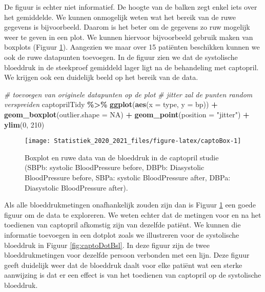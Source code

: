 \documentclass[
  12pt,dutch,coursenotes]{book}
\newenvironment{Shaded}{\begin{snugshade}}{\end{snugshade}}
\newcommand{\CommentTok}[1]{\textcolor[rgb]{0.56,0.35,0.01}{\textit{#1}}}
\newcommand{\DataTypeTok}[1]{\textcolor[rgb]{0.13,0.29,0.53}{#1}}
\newcommand{\DecValTok}[1]{\textcolor[rgb]{0.00,0.00,0.81}{#1}}
\newcommand{\KeywordTok}[1]{\textcolor[rgb]{0.13,0.29,0.53}{\textbf{#1}}}
\newcommand{\NormalTok}[1]{#1}
\newcommand{\OperatorTok}[1]{\textcolor[rgb]{0.81,0.36,0.00}{\textbf{#1}}}
\newcommand{\OtherTok}[1]{\textcolor[rgb]{0.56,0.35,0.01}{#1}}
\newcommand{\StringTok}[1]{\textcolor[rgb]{0.31,0.60,0.02}{#1}}
\theoremstyle{definition}
\theoremstyle{definition}
\theoremstyle{definition}
\theoremstyle{remark}
\begin{document}
De figuur is echter niet informatief.
De hoogte van de balken zegt enkel iets over het gemiddelde.
We kunnen onmogelijk weten wat het bereik van de ruwe gegevens is bijvoorbeeld.
Daarom is het beter om de gegevens zo ruw mogelijk weer te geven in een plot.
We kunnen hiervoor bijvoorbeeld gebruik maken van boxplots (Figuur \ref{fig:captoBox}).
Aangezien we maar over 15 patiënten beschikken kunnen we ook de ruwe datapunten toevoegen.
In de figuur zien we dat de systolische bloeddruk in de steekproef gemiddeld lager ligt na de behandeling met captopril.
We krijgen ook een duidelijk beeld op het bereik van de data.

\begin{Shaded}
\begin{Highlighting}[]
\CommentTok{\# toevoegen van originele datapunten op de plot}
\CommentTok{\# jitter zal de punten random verspreiden}
\NormalTok{captoprilTidy }\OperatorTok{\%\textgreater{}\%}\StringTok{ }\KeywordTok{ggplot}\NormalTok{(}\KeywordTok{aes}\NormalTok{(}\DataTypeTok{x =}\NormalTok{ type, }\DataTypeTok{y =}\NormalTok{ bp)) }\OperatorTok{+}\StringTok{ }\KeywordTok{geom\_boxplot}\NormalTok{(}\DataTypeTok{outlier.shape =} \OtherTok{NA}\NormalTok{) }\OperatorTok{+}\StringTok{ }
\StringTok{    }\KeywordTok{geom\_point}\NormalTok{(}\DataTypeTok{position =} \StringTok{"jitter"}\NormalTok{) }\OperatorTok{+}\StringTok{ }\KeywordTok{ylim}\NormalTok{(}\DecValTok{0}\NormalTok{, }\DecValTok{210}\NormalTok{)}
\end{Highlighting}
\end{Shaded}

\begin{figure}

{\centering \texttt{[image: Statistiek\_2020\_2021\_files/figure-latex/captoBox-1]} 

}

\caption{Boxplot en ruwe data van de bloeddruk in de captopril studie (SBPb: systolic BloodPressure before, DBPb: Diasystolic BloodPressure before, SBPa: systolic BloodPressure after, DBPa: Diasystolic BloodPressure after).}\label{fig:captoBox}
\end{figure}

Als alle bloeddrukmetingen onafhankelijk zouden zijn dan is Figuur \ref{fig:captoBox} een goede figuur om de data te exploreren.
We weten echter dat de metingen voor en na het toedienen van captopril afkomstig zijn van dezelfde patiënt.
We kunnen die informatie toevoegen in een dotplot zoals we illustreren voor de systolische bloeddruk in Figuur \ref{fig:captoDotBsl}.
In deze figuur zijn de twee bloeddrukmetingen voor dezelfde persoon verbonden met een lijn.
Deze figuur geeft duidelijk weer dat de bloeddruk daalt voor elke patiënt wat een sterke aanwijzing is dat er een effect is van het toedienen van captopril op de systolische bloeddruk.
\end{document}
